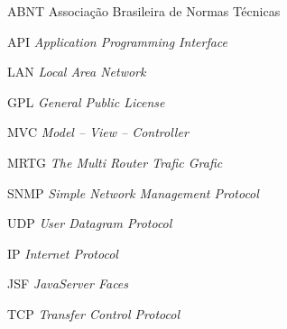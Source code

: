 
\begin{SingleSpace}

\begin{siglas}
\item[ABNT] Associação Brasileira de Normas Técnicas
\item[API] \textit{Application Programming Interface}
\item[LAN] \textit{Local Area Network}
\item[GPL] \textit{General Public License}
\item[MVC] \textit{Model -- View -- Controller}
\item[MRTG] \textit{The Multi Router Trafic Grafic}
\item[SNMP] \textit{Simple Network Management Protocol}
\item[UDP] \textit{User Datagram Protocol}
\item[IP] \textit{Internet Protocol}
\item[JSF] \textit{JavaServer Faces}
\item[TCP] \textit{Transfer Control Protocol}
\end{siglas}

\end{SingleSpace}
